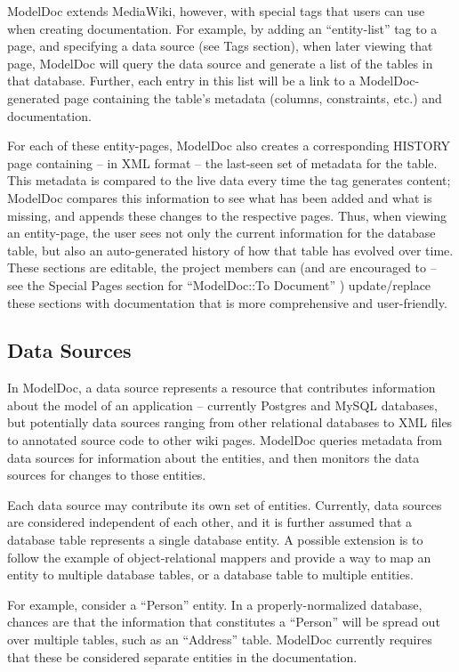 \documentclass[nocopyrightspace]{acm_proc_article-sp}
\begin{document}
ModelDoc extends MediaWiki, however, with special tags that users can use when
creating documentation.  For example, by adding an ``entity-list'' tag to a
page, and specifying a data source (see Tags section), when later viewing that
page, ModelDoc will query the data source and generate a list of the tables in
that database.  Further, each entry in this list will be a link to a
ModelDoc-generated page containing the table's metadata (columns,
constraints, etc.) and documentation.

For each of these entity-pages, ModelDoc also creates a corresponding HISTORY
page containing -- in XML format -- the last-seen set of metadata for the
table.  This metadata is compared to the live data every time the tag generates
content; ModelDoc compares this information to see what has been added and what
is missing, and appends these changes to the respective pages.  Thus, when
viewing an entity-page, the user sees not only the current information for the
database table, but also an auto-generated history of how that table has
evolved over time.  These sections are editable, the project members can (and
are encouraged to -- see the Special Pages section for ``ModelDoc::To Document''
) update/replace these sections with documentation that is more comprehensive
and user-friendly.

\subsection{Data Sources}

In ModelDoc, a data source represents a resource that contributes information
about the model of an application -- currently Postgres and MySQL databases, but
potentially data sources ranging from other relational databases to XML files
to annotated source code to other wiki pages.  ModelDoc queries metadata from
data sources for information about the entities, and then monitors the data
sources for changes to those entities.

Each data source may contribute its own set of entities.  Currently, data
sources are considered independent of each other, and it is further assumed
that a database table represents a single database entity.  A possible
extension is to follow the example of object-relational mappers and provide
a way to map an entity to multiple database tables, or a database table to
multiple entities.

For example, consider a ``Person'' entity.  In a
properly-normalized database, chances are that the information that constitutes a ``Person'' will be spread
out over multiple tables, such as an ``Address'' table.  ModelDoc currently
requires that these be considered separate entities in the documentation.
\end{document}
